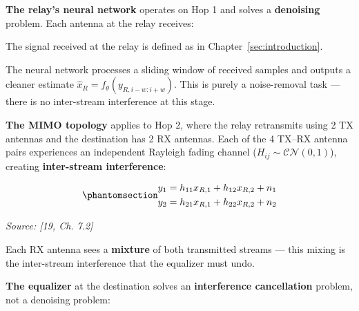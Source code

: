 \textbf{The relay's neural network} operates on Hop 1 and solves a \textbf{denoising} problem. Each antenna at the relay receives:

The signal received at the relay is defined as in Chapter~\ref{sec:introduction}.

The neural network processes a sliding window of received samples and outputs a cleaner estimate \(\hat{x}_R = f_\theta(y_{R,i-w:i+w})\). This is purely a noise-removal task --- there is no inter-stream interference at this stage.

\textbf{The MIMO topology} applies to Hop 2, where the relay retransmits using 2 TX antennas and the destination has 2 RX antennas. Each of the 4 TX--RX antenna pairs experiences an independent Rayleigh fading channel (\(H_{ij} \sim \mathcal{CN}(0,1)\)), creating \textbf{inter-stream interference}:

\begin{equation}\protect\phantomsection\label{eq:mimo-interference}{\begin{aligned}
y_1 &= h_{11} x_{R,1} + h_{12} x_{R,2} + n_1 \\
y_2 &= h_{21} x_{R,1} + h_{22} x_{R,2} + n_2
\end{aligned}
}\end{equation} \par{\small\textit{Source: [19, Ch. 7.2]}}

Each RX antenna sees a \textbf{mixture} of both transmitted streams --- this mixing is the inter-stream interference that the equalizer must undo.

\textbf{The equalizer} at the destination solves an \textbf{interference cancellation} problem, not a denoising problem:

